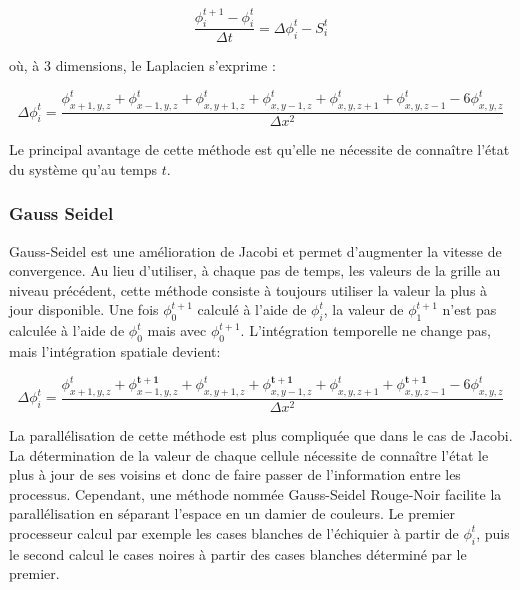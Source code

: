 \[ \dfrac{\phi^{t+1}_i - \phi^{t}_i}{\Delta t}  =  \Delta \phi_i^t - S_i^t \]

où, à 3 dimensions, le Laplacien s'exprime :

\[ \Delta \phi_i^t = \dfrac{\phi_{x+1,y,z}^t  + \phi_{x-1,y,z}^t + \phi_{x,y+1,z}^t  + \phi_{x,y-1,z}^t + \phi_{x,y,z+1}^t + \phi_{x,y,z-1}^t	- 6\phi_{x,y,z}^t}{\Delta x ^2} \]
		
Le principal avantage de cette méthode est qu'elle ne nécessite de connaître l'état du système qu'au temps $t$.

\subsubsection{Gauss Seidel}
Gauss-Seidel est une amélioration de Jacobi et permet d'augmenter la vitesse de convergence.%
Au lieu d'utiliser, à chaque pas de temps, les valeurs de la grille au niveau précédent, cette méthode consiste à toujours utiliser la valeur la plus à jour disponible. 
Une fois $\phi^{t+1}_0$ calculé à l'aide de $\phi^{t}_i$, la valeur de $\phi^{t+1}_1$ n'est pas calculée à l'aide de $\phi^{t}_0$ mais avec $\phi^{t+1}_0$. 
L'intégration temporelle ne change pas, mais l'intégration spatiale devient: 

\[ \Delta \phi_i^t = \dfrac{\phi_{x+1,y,z}^t  + \phi_{x-1,y,z}^\mathbf{t+1} + \phi_{x,y+1,z}^t  + \phi_{x,y-1,z}^\mathbf{t+1} + \phi_{x,y,z+1}^t + \phi_{x,y,z-1}^\mathbf{t+1}	- 6\phi_{x,y,z}^t}{\Delta x ^2} \]

La parallélisation de cette méthode est plus compliquée que dans le cas de Jacobi. 
La détermination de la valeur de chaque cellule nécessite de connaître l'état le plus à jour de ses voisins et donc de faire passer de l'information entre les processus.
Cependant, une méthode nommée Gauss-Seidel Rouge-Noir facilite la parallélisation en séparant l'espace en un damier de couleurs. 
Le premier processeur calcul par exemple les cases blanches de l'échiquier à partir de $\phi_i^t$, puis le second calcul le cases noires à partir des cases blanches déterminé par le premier.


